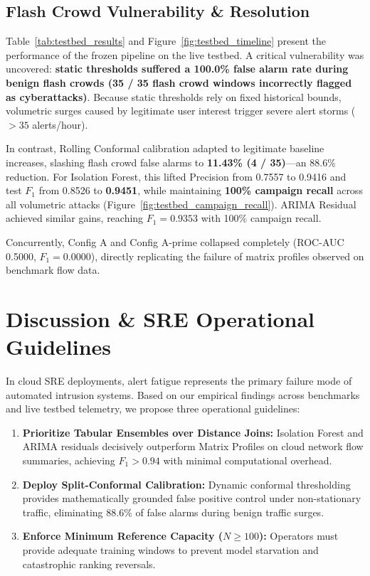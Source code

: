\documentclass[10pt,twocolumn]{article}
\begin{document}
\newpage

\subsection{Flash Crowd Vulnerability \& Resolution}
Table~\ref{tab:testbed_results} and Figure~\ref{fig:testbed_timeline} present the performance of the frozen pipeline on the live testbed. A critical vulnerability was uncovered: \textbf{static thresholds suffered a 100.0\% false alarm rate during benign flash crowds (35 / 35 flash crowd windows incorrectly flagged as cyberattacks)}. Because static thresholds rely on fixed historical bounds, volumetric surges caused by legitimate user interest trigger severe alert storms ($> 35$ alerts/hour).

In contrast, Rolling Conformal calibration adapted to legitimate baseline increases, slashing flash crowd false alarms to \textbf{11.43\% (4 / 35)}---an 88.6\% reduction. For Isolation Forest, this lifted Precision from 0.7557 to 0.9416 and test $F_1$ from 0.8526 to \textbf{0.9451}, while maintaining \textbf{100\% campaign recall} across all volumetric attacks (Figure~\ref{fig:testbed_campaign_recall}). ARIMA Residual achieved similar gains, reaching $F_1 = 0.9353$ with 100\% campaign recall.

Concurrently, Config A and Config A-prime collapsed completely (ROC-AUC 0.5000, $F_1 = 0.0000$), directly replicating the failure of matrix profiles observed on benchmark flow data.

\newpage

\section{Discussion \& SRE Operational Guidelines}
In cloud SRE deployments, alert fatigue represents the primary failure mode of automated intrusion systems. Based on our empirical findings across benchmarks and live testbed telemetry, we propose three operational guidelines:
\begin{enumerate}
    \item \textbf{Prioritize Tabular Ensembles over Distance Joins:} Isolation Forest and ARIMA residuals decisively outperform Matrix Profiles on cloud network flow summaries, achieving $F_1 > 0.94$ with minimal computational overhead.
    \item \textbf{Deploy Split-Conformal Calibration:} Dynamic conformal thresholding provides mathematically grounded false positive control under non-stationary traffic, eliminating 88.6\% of false alarms during benign traffic surges.
    \item \textbf{Enforce Minimum Reference Capacity ($N \ge 100$):} Operators must provide adequate training windows to prevent model starvation and catastrophic ranking reversals.
\end{enumerate}
\end{document}
